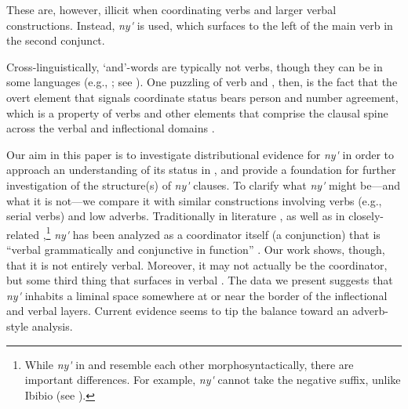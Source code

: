 \documentclass[output=paper]{../langsci/langscibook}
\begin{document}
\noindent These are, however, illicit when coordinating verbs and larger verbal constructions. Instead, \textit{ny\'{\textturnv}\ng} is used, which surfaces to the left of the main verb in the second conjunct.

\ea\label{ex:duncan-et-al:3}
\z
\z

\noindent Cross-linguistically, `and'-words are typically not verbs, though they can be in some languages (e.g., ; see \citealt{brown2008verbs}). One puzzling  of  verb and , then, is the fact that the overt element that signals coordinate status bears person and number agreement, which is a property of verbs and other elements that comprise the clausal spine across the verbal and inflectional domains \citep{baker2010agreement}.

Our aim in this paper is to investigate distributional evidence for \textit{ny\'{\textturnv}\ng} in order to approach an understanding of its status in , and provide a foundation for further investigation of the structure(s) of \textit{ny\'{\textturnv}\ng} clauses. To clarify what \textit{ny\'{\textturnv}\ng} might be---and what it is not---we compare it with similar constructions involving verbs (e.g., serial verbs) and low adverbs. Traditionally in  literature \citep{essien1985negation,essien1990grammar}, as well as in closely-related  \citep{goldie1857principles,welmers1968efik,welmers1973african},\footnote{While \textit{ny\'{\textturnv}\ng} in  and  resemble each other morphosyntactically, there are important differences. For example,  \textit{ny\'{\textturnv}\ng} cannot take the negative suffix, unlike Ibibio (see ).} \textit{ny\'{\textturnv}\ng} has been analyzed as a coordinator itself (a conjunction) that is ``verbal grammatically and conjunctive in function'' \citep[148]{essien1990grammar}. Our work shows, though, that it is not entirely verbal. Moreover, it may not actually be the coordinator, but some third thing that surfaces in verbal . The data we present suggests that \textit{ny\'{\textturnv}\ng} inhabits a liminal space somewhere at or near the border of the inflectional and verbal layers. Current evidence seems to tip the balance toward an adverb-style analysis.
\end{document}
